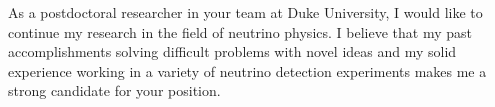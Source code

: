 \documentclass[10pt]{article} %
\begin{document}
%

As a postdoctoral researcher in your team at Duke University, I would like to
continue my research in the field of neutrino physics. I believe that my past
accomplishments solving difficult problems with novel ideas and my solid
experience working in a variety of neutrino detection experiments makes me a
strong candidate for your position. 


\clearpage
\renewcommand\refname{Publications} %

\nocite{*} %
%
\end{document}
